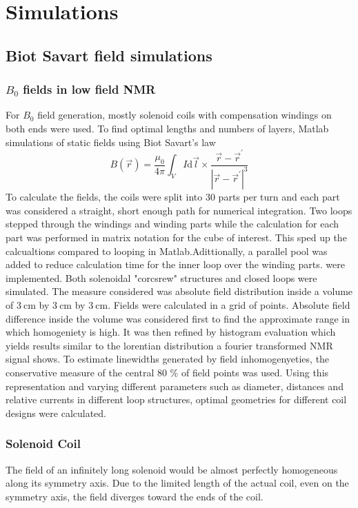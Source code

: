 \chapter{Simulations}\label{chapter:simulations}
\section{Biot Savart field simulations}
\subsection{$B_0$ fields in low field NMR}\label{simulations:B0}
        For $B_0$ field generation, mostly solenoid coils with compensation windings on both ends were used. To find optimal lengths and numbers of layers, Matlab simulations of static fields using Biot Savart's law 
        \begin{equation}
            B(\vec r) = \frac{\mu_0}{4\pi} \int_V I\mathrm{d} \vec l \times \frac{\vec r - \vec r^{'}}{\left|\vec r - \vec r^{'}\right|^3}
        \end{equation}
        To calculate the fields, the coils were split into 30 parts per turn and each part was considered a straight, short enough path for numerical integration. Two loops stepped through the windings and winding parts while the calculation for each part was performed in matrix notation for the cube of interest. This sped up the calcualtions compared to looping in Matlab.Adittionally, a parallel pool was added to reduce calculation time for the inner loop over the winding parts.
        were implemented.  Both solenoidal "corcsrew" structures and closed loops were simulated. The measure considered was absolute field distribution inside a volume of $\SI{3}{\centi\meter}$ by  $\SI{3}{\centi\meter}$ by $\SI{3}{\centi\meter}$.  Fields were calculated in a grid of  points. Absolute field difference inside the volume was considered first to find the approximate range in which homogeniety is high.  It was then refined by histogram evaluation which yields results similar to the lorentian distribution a fourier transformed NMR signal shows. To estimate linewidths generated by field inhomogenyeties, the conservative measure of the central 80 \% of field points was used.  Using this representation and varying different parameters such as diameter, distances and relative currents in different loop structures, optimal geometries for different coil designs were calculated.
        \subsection{Solenoid Coil}
            The field of an infinitely long solenoid would be almost perfectly homogeneous along its symmetry axis. Due to the limited length of the actual coil, even on the symmetry axis, the field diverges toward the ends of the coil.
